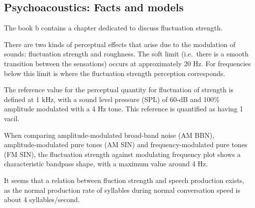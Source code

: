 \subsection{Psychoacoustics: Facts and models}

The book b \cite{Fastl2007Psychoacoustics} contains a chapter dedicated to
discuss fluctuation strength.

There are two kinds of perceptual effects that arise due to the modulation of
sounds: fluctuation strength and roughness. The soft limit (i.e.\ there is a
smooth transition between the sensations) occurs at approximately 20 Hz. For
frequencies below this limit is where the fluctuation strength perception
corresponds.

The reference value for the perceptual quantity for fluctuation of strength is
defined at 1 kHz, with a sound level pressure (SPL) of 60-dB and 100\% amplitude
modulated with a 4 Hz tone. This reference is quantified as having 1 vacil.

When comparing amplitude-modulated broad-band noise (AM BBN), \\
amplitude-modulated pure tones (AM SIN) and frequency-modulated pure tones
(FM SIN), the fluctuation strength against modulating frequency plot shows a
characteristic bandpass shape, with a maximum value around 4 Hz.

It seems that a relation between fluction strength and speech production exists,
as the normal production rate of syllables during normal conversation speed is
about 4 syllables/second.
